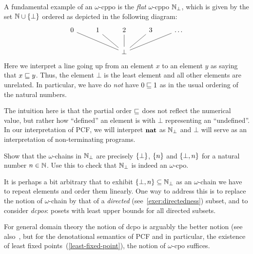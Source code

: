 \begin{example}[\(\Nat_\bot\)]\label{exam:N_bot}
  A fundamental example of an \(\omega\)-cppo is the \emph{flat} \(\omega\)-cppo
  \(\Nat_\bot\), which is given by the set \(\mathbb N \cup \{\bot\}\) ordered as
  depicted in the following diagram:
  \[
    \begin{tikzcd}
      0 & 1 & 2 & 3 & \ldots \\
      & & \bot \ar[ull,no head] \ar[ul,no head] \ar[u,no head] \ar[ur, no head]
      \ar[urr, no head]
    \end{tikzcd}
  \]
  Here we interpret a line going up from an element \(x\) to an element \(y\) as
  saying that \(x \sqsubseteq y\).
  Thus, the element \(\bot\) is the least element and all other elements are
  unrelated.
  In particular, we have do \emph{not} have \(0 \sqsubseteq 1\) as in the usual
  ordering of the natural numbers.

  The intuition here is that the partial order \({\sqsubseteq}\) does not reflect the
  numerical value, but rather how ``defined'' an element is with \(\bot\)
  representing an ``undefined''.
  In our interpretation of PCF, we will interpret \(\mathtt{\mathbf{nat}}\) as \(\Nat_\bot\)
  and \(\bot\) will serve as an interpretation of non-terminating programs.
\end{example}

\begin{exercise}\label{exer:N_bot}
  Show that the \(\omega\)-chains in \(\Nat_\bot\) are precisely \(\{\bot\}\),
  \(\{n\}\) and \(\{\bot,n\}\) for a natural number \(n \in \mathbb N\).
  Use this to check that \(\Nat_\bot\) is indeed an \(\omega\)-cpo.
\end{exercise}

\begin{remark}
  It is perhaps a bit arbitrary that to exhibit
  \(\{\bot,n\} \subseteq \mathbb N_\bot\) as an \(\omega\)-chain we have to repeat
  elements and order them linearly.
  One way to address this is to replace the notion of \(\omega\)-chain by that
  of a \emph{directed} (see~\cref{exer:directedness}) subset, and to consider
  \emph{dcpos}: posets with least upper bounds for all directed subsets.

  For general domain theory the notion of dcpo is arguably the better notion
  (see also~\cite[Section~2.2.4]{AbramskyJung1994}, but for the denotational
  semantics of PCF and in particular, the existence of least fixed
  points~(\cref{least-fixed-point}), the notion of \(\omega\)-cpo suffices.
\end{remark}

